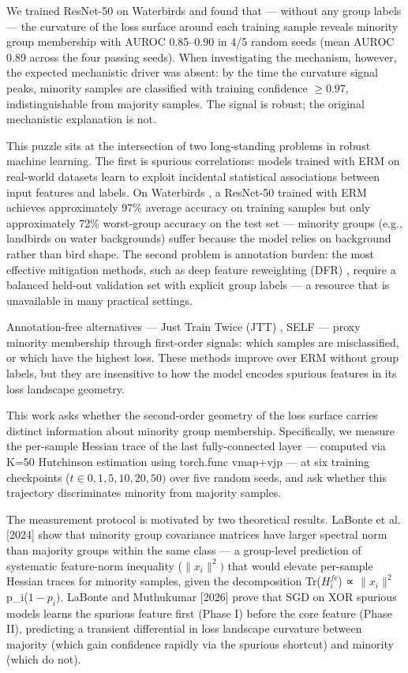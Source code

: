 
We trained ResNet-50 on Waterbirds and found that --- without any group labels --- the curvature of the loss surface around each training sample reveals minority group membership with AUROC 0.85--0.90 in 4/5 random seeds (mean AUROC 0.89 across the four passing seeds). When investigating the mechanism, however, the expected mechanistic driver was absent: by the time the curvature signal peaks, minority samples are classified with training confidence $\geq 0.97$, indistinguishable from majority samples. The signal is robust; the original mechanistic explanation is not.

This puzzle sits at the intersection of two long-standing problems in robust machine learning. The first is spurious correlations: models trained with ERM on real-world datasets learn to exploit incidental statistical associations between input features and labels. On Waterbirds \citep{sagawa2019distributionally}, a ResNet-50 trained with ERM achieves approximately 97\% average accuracy on training samples but only approximately 72\% worst-group accuracy on the test set --- minority groups (e.g., landbirds on water backgrounds) suffer because the model relies on background rather than bird shape. The second problem is annotation burden: the most effective mitigation methods, such as deep feature reweighting (DFR) \citep{kirichenko2022last}, require a balanced held-out validation set with explicit group labels --- a resource that is unavailable in many practical settings.

Annotation-free alternatives --- Just Train Twice (JTT) \citep{liu2021just}, SELF \citep{labonte2023towards} --- proxy minority membership through first-order signals: which samples are misclassified, or which have the highest loss. These methods improve over ERM without group labels, but they are insensitive to how the model encodes spurious features in its loss landscape geometry.

This work asks whether the second-order geometry of the loss surface carries distinct information about minority group membership. Specifically, we measure the per-sample Hessian trace of the last fully-connected layer --- computed via K=50 Hutchinson estimation using torch.func vmap+vjp --- at six training checkpoints ($t\in {0,1,5,10,20,50})$ over five random seeds, and ask whether this trajectory discriminates minority from majority samples.

The measurement protocol is motivated by two theoretical results. LaBonte et al. [2024] show that minority group covariance matrices have larger spectral norm than majority groups within the same class --- a group-level prediction of systematic feature-norm inequality ($\|x_{i}\|^{2})$ that would elevate per-sample Hessian traces for minority samples, given the decomposition Tr($H_i^{fc}$) ∝ $\|x_{i}\|^2$ p\_i($1-p_{i})$. LaBonte and Muthukumar [2026] prove that SGD on XOR spurious models learns the spurious feature first (Phase I) before the core feature (Phase II), predicting a transient differential in loss landscape curvature between majority (which gain confidence rapidly via the spurious shortcut) and minority (which do not).

